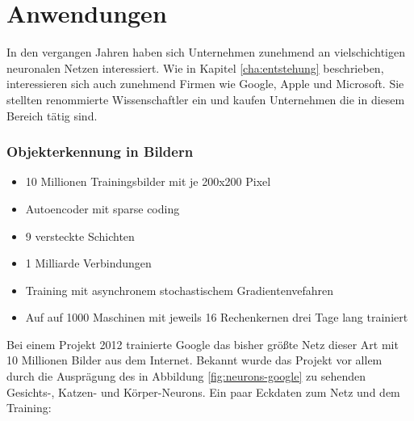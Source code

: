 \chapter{Anwendungen}
\label{cha:anwendungen}

In den vergangen Jahren haben sich Unternehmen zunehmend an vielschichtigen neuronalen Netzen interessiert. Wie in Kapitel \ref{cha:entstehung} beschrieben, interessieren sich auch zunehmend Firmen wie Google, Apple und Microsoft. Sie stellten renommierte Wissenschaftler ein und kaufen Unternehmen die in diesem Bereich tätig sind.

\subsection{Objekterkennung in Bildern}

\begin{itemize}
\item 10 Millionen Trainingsbilder mit je 200x200 Pixel
\item Autoencoder mit sparse coding
\item 9 versteckte Schichten
\item 1 Milliarde Verbindungen
\item Training mit asynchronem stochastischem Gradientenvefahren
\item Auf auf 1000 Maschinen mit jeweils 16 Rechenkernen drei Tage lang trainiert
\end{itemize}

Bei einem Projekt \citep{googleimage} 2012 trainierte Google das bisher größte Netz dieser Art mit 10 Millionen Bilder aus dem Internet. Bekannt wurde das Projekt vor allem durch die Ausprägung des in Abbildung \ref{fig:neurons-google} zu sehenden Gesichts-, Katzen- und Körper-Neurons. Ein paar Eckdaten zum Netz und dem Training:

